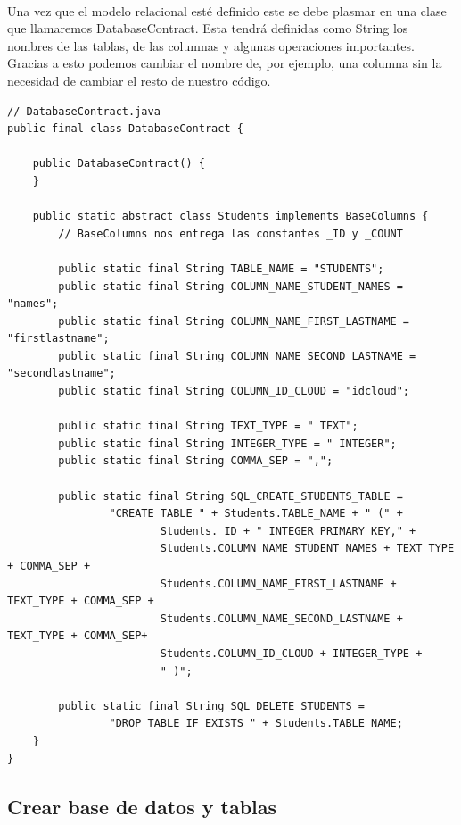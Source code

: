 \documentclass[10pt]{extarticle}
\begin{document}
\paragraph{}
Una vez que el modelo relacional esté definido este se debe plasmar en una clase que llamaremos DatabaseContract. Esta tendrá definidas como String los nombres de las tablas, de las columnas y algunas operaciones importantes. Gracias a esto podemos cambiar el nombre de, por ejemplo, una columna sin la necesidad de cambiar el resto de nuestro código.

\begin{lstlisting}
// DatabaseContract.java
public final class DatabaseContract {

    public DatabaseContract() {
    }

    public static abstract class Students implements BaseColumns {
		// BaseColumns nos entrega las constantes _ID y _COUNT
		
        public static final String TABLE_NAME = "STUDENTS";
        public static final String COLUMN_NAME_STUDENT_NAMES = "names";
        public static final String COLUMN_NAME_FIRST_LASTNAME = "firstlastname";
        public static final String COLUMN_NAME_SECOND_LASTNAME = "secondlastname";
        public static final String COLUMN_ID_CLOUD = "idcloud";

        public static final String TEXT_TYPE = " TEXT";
        public static final String INTEGER_TYPE = " INTEGER";
        public static final String COMMA_SEP = ",";

        public static final String SQL_CREATE_STUDENTS_TABLE =
                "CREATE TABLE " + Students.TABLE_NAME + " (" +
                        Students._ID + " INTEGER PRIMARY KEY," +
                        Students.COLUMN_NAME_STUDENT_NAMES + TEXT_TYPE + COMMA_SEP +
                        Students.COLUMN_NAME_FIRST_LASTNAME + TEXT_TYPE + COMMA_SEP +
                        Students.COLUMN_NAME_SECOND_LASTNAME + TEXT_TYPE + COMMA_SEP+
                        Students.COLUMN_ID_CLOUD + INTEGER_TYPE +
                        " )";

        public static final String SQL_DELETE_STUDENTS =
                "DROP TABLE IF EXISTS " + Students.TABLE_NAME;
    }
}
\end{lstlisting}

\subsection{Crear base de datos y tablas}
\end{document}
